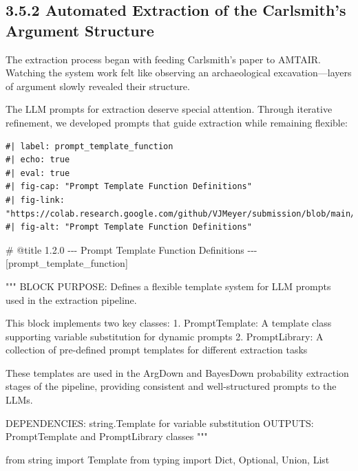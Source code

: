 \documentclass[
  11pt,
  letterpaper,
]{book}
\newenvironment{Shaded}{\begin{snugshade}}{\end{snugshade}}
\newcommand{\CommentTok}[1]{\textcolor[rgb]{0.37,0.37,0.37}{#1}}
\newcommand{\ImportTok}[1]{\textcolor[rgb]{0.00,0.46,0.62}{#1}}
\newcommand{\NormalTok}[1]{\textcolor[rgb]{0.00,0.23,0.31}{#1}}
\begin{document}
\begin{landscape}

\subsection{3.5.2 Automated Extraction of the Carlsmith's Argument
Structure}\label{sec-carlsmith-extraction}

The extraction process began with feeding Carlsmith's paper to AMTAIR.
Watching the system work felt like observing an archaeological
excavation---layers of argument slowly revealed their structure.

The LLM prompts for extraction deserve special attention. Through
iterative refinement, we developed prompts that guide extraction while
remaining flexible:

\begin{verbatim}
#| label: prompt_template_function
#| echo: true
#| eval: true
#| fig-cap: "Prompt Template Function Definitions"
#| fig-link: "https://colab.research.google.com/github/VJMeyer/submission/blob/main/AMTAIR_Prototype/data/example_carlsmith/AMTAIR_Prototype_example_carlsmith.ipynb#scrollTo=MJpgdepF2Ug3&line=5&uniqifier=1"
#| fig-alt: "Prompt Template Function Definitions"
\end{verbatim}

\label{prompt_template_function}
\begin{Shaded}
\begin{Highlighting}[]
\CommentTok{\# @title 1.2.0 {-}{-}{-} Prompt Template Function Definitions {-}{-}{-} [prompt\_template\_function]}

\CommentTok{"""}
\CommentTok{BLOCK PURPOSE: Defines a flexible template system for LLM prompts used in the extraction pipeline.}

\CommentTok{This block implements two key classes:}
\CommentTok{1. PromptTemplate: A template class supporting variable substitution for dynamic prompts}
\CommentTok{2. PromptLibrary: A collection of pre{-}defined prompt templates for different extraction tasks}

\CommentTok{These templates are used in the ArgDown and BayesDown probability extraction}
\CommentTok{stages of the pipeline, providing consistent and well{-}structured prompts to the LLMs.}

\CommentTok{DEPENDENCIES: string.Template for variable substitution}
\CommentTok{OUTPUTS: PromptTemplate and PromptLibrary classes}
\CommentTok{"""}

\ImportTok{from}\NormalTok{ string }\ImportTok{import}\NormalTok{ Template}
\ImportTok{from}\NormalTok{ typing }\ImportTok{import}\NormalTok{ Dict, Optional, Union, List}


\end{Highlighting}
\end{Shaded}
\end{landscape}
\end{document}
